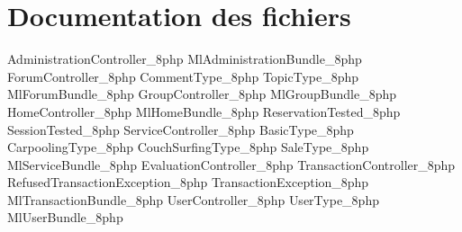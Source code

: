 \chapter{Documentation des fichiers}
{AdministrationController_8php}
{MlAdministrationBundle_8php}
{ForumController_8php}
{CommentType_8php}
{TopicType_8php}
{MlForumBundle_8php}
{GroupController_8php}
{MlGroupBundle_8php}
{HomeController_8php}
{MlHomeBundle_8php}
{ReservationTested_8php}
{SessionTested_8php}
{ServiceController_8php}
{BasicType_8php}
{CarpoolingType_8php}
{CouchSurfingType_8php}
{SaleType_8php}
{MlServiceBundle_8php}
{EvaluationController_8php}
{TransactionController_8php}
{RefusedTransactionException_8php}
{TransactionException_8php}
{MlTransactionBundle_8php}
{UserController_8php}
{UserType_8php}
{MlUserBundle_8php}
